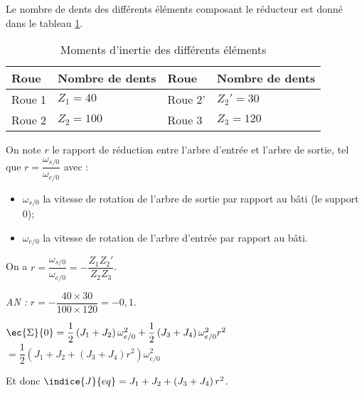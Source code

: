  Le nombre de dents des différents éléments composant le réducteur est donné dans le tableau \ref{tab_94_02}.

\begin{table}[!h]
\begin{tabular}{llll}
\hline
Roue & Nombre de dents & Roue & Nombre de dents\\ \hline
Roue 1 		& $Z_1 = 40$ 	& Roue 2' 	& $Z_2' = 30$ 	\\
Roue 2 		& $Z_2 = 100$ 	& Roue 3	& $Z_3 = 120$ 	\\
 \hline
\end{tabular}
\caption{Moments d’inertie des différents éléments \label{tab_94_02}}
 \end{table}

 On note $r$ le rapport de réduction entre l’arbre d’entrée et l’arbre de sortie, tel que $r = \dfrac{\omega_{s/0}}{\omega_{e/0}}$ avec :
\begin{itemize}
 	\item  $\omega_{s/0}$ la vitesse de rotation de l’arbre de sortie par rapport au bâti (le support 0);
 	\item $\omega_{e/0}$ la vitesse de rotation de l’arbre d'entrée par rapport au bâti.
\end{itemize}

\fi


\ifprof
\begin{corrige}
On a $r = \dfrac{\omega_{s/0}}{\omega_{e/0}} = - \dfrac{Z_1 Z_2'}{Z_2 Z_3} $.

\textit{AN :} $r =  - \dfrac{40 \times 30}{100 \times 120}  = -0,1$.
\end{corrige}

\else
\fi


\ifprof 
\begin{corrige}
$\ec{\Sigma}{0} = \dfrac{1}{2}\left( J_1 + J_2 \right) \omega_{e/0}^2 + \dfrac{1}{2}\left( J_3 + J_4 \right) \omega_{e/0}^2r^2 $
$= \dfrac{1}{2}\left(  J_1 + J_2  + \left( J_3 + J_4 \right)r^2  \right)\omega_{e/0}^2$

Et donc $\indice{J}{eq}= J_1 + J_2  + \left( J_3 + J_4 \right)r^2 $.
\end{corrige}
\else
\fi

